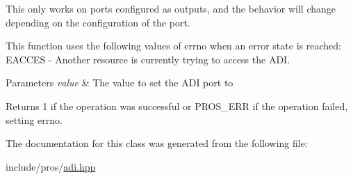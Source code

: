 This only works on ports configured as outputs, and the behavior will change depending on the configuration of the port.

This function uses the following values of errno when an error state is reached\+: E\+A\+C\+C\+ES -\/ Another resource is currently trying to access the A\+DI.


\begin{DoxyParams}{Parameters}
{\em value} & The value to set the A\+DI port to\\
\hline
\end{DoxyParams}
\begin{DoxyReturn}{Returns}
1 if the operation was successful or P\+R\+O\+S\+\_\+\+E\+RR if the operation failed, setting errno. 
\end{DoxyReturn}


The documentation for this class was generated from the following file\+:\begin{DoxyCompactItemize}
\item 
include/pros/\mbox{\hyperlink{adi_8hpp}{adi.\+hpp}}\end{DoxyCompactItemize}
